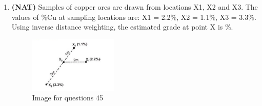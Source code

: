 \documentclass[journal,12pt,onecolumn]{IEEEtran}
\theoremstyle{remark}
\begin{document}
\begin{enumerate}
\item \textbf{(NAT)} Samples of copper ores are drawn from locations X1, X2 and X3. The values of \%Cu at sampling locations are:  
X1 = 2.2\%, X2 = 1.1\%, X3 = 3.3\%.  
Using inverse distance weighting, the estimated grade at point X is \underline{\hspace{3cm}} \%.  

\begin{figure}[H]
    \centering
    \includegraphics[width=0.4\textwidth]{figs/fig9.png}
    \caption{Image for questions 45}
    \label{fig:question45}
\end{figure}


\vspace{0.3cm}

\end{enumerate}
\end{document}

